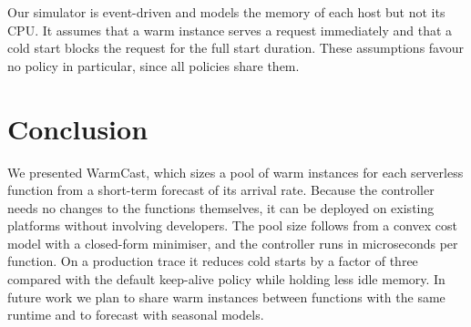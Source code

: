 \documentclass[10pt]{article}
\begin{document}
Our simulator is event-driven and models the memory of each host but not its
CPU. It assumes that a warm instance serves a request immediately and that a
cold start blocks the request for the full start duration. These assumptions
favour no policy in particular, since all policies share them.

\section{Conclusion}
\label{sec:conclusion}

We presented WarmCast, which sizes a pool of warm instances for each
serverless function from a short-term forecast of its arrival rate. Because
the controller needs no changes to the functions themselves, it can be
deployed on existing platforms without involving developers. The pool
size follows from a convex cost model with a closed-form minimiser, and the
controller runs in microseconds per function. On a production trace it
reduces cold starts by a factor of three compared with the default keep-alive
policy while holding less idle memory. In future work we plan to share warm
instances between functions with the same runtime and to forecast with
seasonal models.
\end{document}
